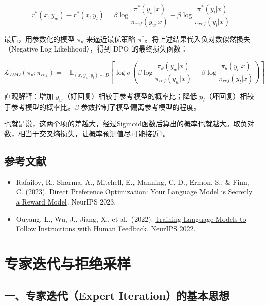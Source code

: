 \[
r^*(x,y_w)-r^*(x,y_l)=\beta\log\frac{\pi^*(y_w|x)}{\pi_{ref}(y_w|x)}-\beta\log\frac{\pi^*(y_l|x)}{\pi_{ref}(y_l|x)}
\]

最后，用参数化的模型 \(\pi_\theta\) 来逼近最优策略 \(\pi^*\)。将上述结果代入负对数似然损失（Negative Log Likelihood），得到 DPO 的最终损失函数：

\[
\mathcal{L}_{DPO}(\pi_\theta;\pi_{ref})=-\mathbb{E}_{(x,y_w,y_l)\sim D}\left[\log\sigma\left(\beta\log\frac{\pi_\theta(y_w|x)}{\pi_{ref}(y_w|x)}-\beta\log\frac{\pi_\theta(y_l|x)}{\pi_{ref}(y_l|x)}\right)\right]
\]

直观解释：增加 \(y_w\)（好回复）相较于参考模型的概率比；降低 \(y_l\)（坏回复）相较于参考模型的概率比。\(\beta\) 参数控制了模型偏离参考模型的程度。

也就是说，这两个项的差越大，经过Sigmoid函数后算出的概率也就越大。取负对数，相当于交叉熵损失，让概率预测值尽可能接近1。

\hypertarget{ux53c2ux8003ux6587ux732e-80}{%
\subsection{参考文献}\label{ux53c2ux8003ux6587ux732e-80}}

\vspace{0.25em}
\begin{itemize}
\tightlist
\item
  Rafailov, R., Sharma, A., Mitchell, E., Manning, C. D., Ermon, S., \& Finn, C. (2023). \href{https://arxiv.org/abs/2305.18290}{Direct Preference Optimization: Your Language Model is Secretly a Reward Model}. NeurIPS 2023.
\item
  Ouyang, L., Wu, J., Jiang, X., et al.~(2022). \href{https://arxiv.org/abs/2203.02155}{Training Language Models to Follow Instructions with Human Feedback}. NeurIPS 2022.
\end{itemize}

\clearpage

\hypertarget{ux4e13ux5bb6ux8fedux4ee3ux4e0eux62d2ux7eddux91c7ux6837}{%
\section{专家迭代与拒绝采样}\label{ux4e13ux5bb6ux8fedux4ee3ux4e0eux62d2ux7eddux91c7ux6837}}

\hypertarget{ux4e00ux4e13ux5bb6ux8fedux4ee3expert-iterationux7684ux57faux672cux601dux60f3}{%
\subsection{一、专家迭代（Expert Iteration）的基本思想}\label{ux4e00ux4e13ux5bb6ux8fedux4ee3expert-iterationux7684ux57faux672cux601dux60f3}}

